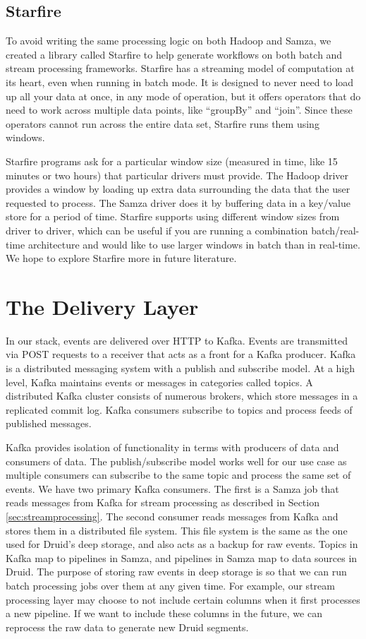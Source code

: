 \documentclass{vldb}
\begin{document}
{\subsection{Starfire}
To avoid writing the same processing logic on both Hadoop and Samza, we created
a library called Starfire to help generate workflows on both batch and stream
processing frameworks. Starfire has a streaming model of computation at its
heart, even when running in batch mode. It is designed to never need to load up
all your data at once, in any mode of operation, but it offers operators that
do need to work across multiple data points, like “groupBy” and “join”. Since
these operators cannot run across the entire data set, Starfire runs them using
windows.

Starfire programs ask for a particular window size (measured in time, like 15
minutes or two hours) that particular drivers must provide. The Hadoop driver
provides a window by loading up extra data surrounding the data that the user
requested to process. The Samza driver does it by buffering data in a key/value
store for a period of time. Starfire supports using different window sizes from
driver to driver, which can be useful if you are running a combination
batch/real-time architecture and would like to use larger windows in batch than
in real-time. We hope to explore Starfire more in future literature.

\section{The Delivery Layer}
\label{sec:delivery}
In our stack, events are delivered over HTTP to Kafka. Events are transmitted
via POST requests to a receiver that acts as a front for a Kafka producer.
Kafka is a distributed messaging system with a publish and subscribe model. At
a high level, Kafka maintains events or messages in categories called topics. A
distributed Kafka cluster consists of numerous brokers, which store messages in
a replicated commit log. Kafka consumers subscribe to topics and process feeds
of published messages. 

Kafka provides isolation of functionality in terms with producers of data and
consumers of data. The publish/subscribe model works well for our use case as
multiple consumers can subscribe to the same topic and process the same set of
events. We have two primary Kafka consumers. The first is a Samza job that
reads messages from Kafka for stream processing as described in Section
\ref{sec:streamprocessing}. The second consumer reads messages from Kafka and
stores them in a distributed file system.  This file system is the same as the
one used for Druid’s deep storage, and also acts as a backup for raw events.
Topics in Kafka map to pipelines in Samza, and pipelines in Samza map
to data sources in Druid. The purpose of storing raw events in deep
storage is so that we can run batch processing jobs over them at any given
time. For example, our stream processing layer may choose to not include
certain columns when it first processes a new pipeline. If we want to include
these columns in the future, we can reprocess the raw data to generate new
Druid segments. 

}
\end{document}
